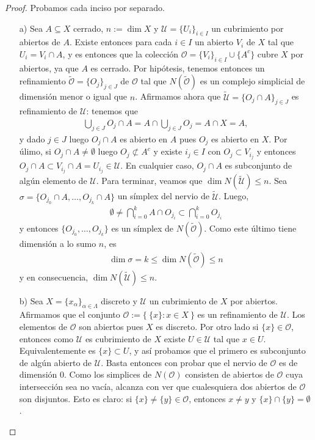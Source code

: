 \documentclass[12pt]{article}
\begin{document}
\begin{proof} Probamos cada inciso por separado.
\begin{itemize}
\item[a)] Sea $A \subseteq X$ cerrado, $n := \dim X$ y $\mathcal{U} = \{U_i\}_{i \in I}$ un cubrimiento por abiertos de $A$. Existe entonces para cada $i \in I$ un abierto $V_i$ de $X$ tal que $U_i = V_i \cap A$, y es entonces que la colecci\'on $\mathcal{O} = \{V_i\}_{i \in I} \cup \{A^c\}$ cubre $X$ por abiertos, ya que $A$ es cerrado. Por hip\'otesis, tenemos entonces un refinamiento $\tilde{\mathcal{O}} = \{O_j\}_{j \in J}$ de $\mathcal{O}$ tal que $N(\tilde{\mathcal{O}})$ es un complejo simplicial de dimensi\'on menor o igual que $n$. Afirmamos ahora que $\tilde{\mathcal{U}} = \{O_j \cap A\}_{j \in J}$ es refinamiento de $\mathcal{U}$: tenemos que
\begin{align*}
\bigcup_{j \in J} O_j \cap A = A \cap \bigcup_{j \in J}O_j = A \cap X = A,
\end{align*}
y dado $j \in J$ luego $O_j \cap A$ es abierto en $A$ pues $O_j$ es abierto en $X$. Por \'ulimo, si $O_j \cap A \neq \emptyset$ luego $O_j \not \subset A^c$ y existe $i_j \in I$ con $O_j \subset V_{i_j}$ y entonces $O_j \cap A \subset V_{i_j} \cap A = U_{i_j} \in \mathcal{U}$. En cualquier caso, $O_j \cap A$ es subconjunto de alg\'un elemento de $\mathcal{U}$. Para terminar, veamos que $\dim N(\tilde{\mathcal{U}}) \leq n$. Sea $\sigma = \{O_{j_0} \cap A, \dots, O_{j_k} \cap A \}$ un s\'implex del nervio de $\tilde{\mathcal{U}}$. Luego, 
\begin{align*}
\emptyset \neq \bigcap_{i=0}^k A \cap O_{j_i} \subset \bigcap_{i=0}^k O_{j_i}
\end{align*}
y entonces $\{O_{j_0}, \dots, O_{j_k}\}$ es un s\'implex de $N(\tilde{\mathcal{O}})$. Como este \'ultimo tiene dimensi\'on a lo sumo $n$, es 
\begin{align*}
\dim \sigma  = k \leq \dim N(\tilde{\mathcal{O}}) \leq n
\end{align*}
y en consecuencia, $\dim N(\tilde{\mathcal{U}}) \leq n$.
\item[b)] Sea $X = \{x_\alpha\}_{\alpha \in \Lambda}$ discreto y $\mathcal{U}$ un cubrimiento de $X$ por abiertos. Afirmamos que el conjunto $\mathcal{O} := \{ \ \{x\} : x \in X \ \}$ es un refinamiento de $\mathcal{U}$. Los elementos de $\mathcal{O}$ son abiertos pues $X$ es discreto. Por otro lado si $\{x\} \in \mathcal{O}$, entonces como $\mathcal{U}$ es cubrimiento de $X$ existe $U \in \mathcal{U}$ tal que $x \in U$. Equivalentemente es $\{x\} \subset U$, y as\'i probamos que el primero es subconjunto de alg\'un abierto de $\mathcal{U}$. Basta entonces con probar que el nervio de $\mathcal{O}$ es de dimensi\'on $0$. Como los simplices de $N(\mathcal{O})$ consisten de abiertos de $\mathcal{O}$ cuya intersecci\'on sea no vac\'ia, alcanza con ver que cualesquiera dos abiertos de $\mathcal{O}$ son disjuntos. Esto es claro: si $\{x\} \neq \{y\} \in \mathcal{O}$, entonces $x \neq y$ y $\{x\} \cap \{y\} = \emptyset$. 

\end{itemize}
\end{proof}
\end{document}

